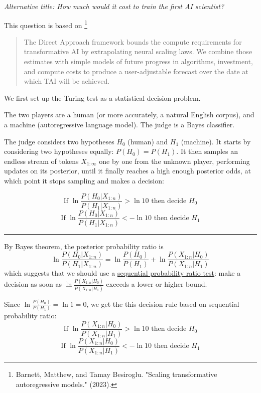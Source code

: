 
\textit{Alternative title: How much would it cost to train the first AI scientist?}

This question is based on \footnote{Barnett, Matthew, and Tamay Besiroglu. "Scaling transformative autoregressive models." (2023).}

\begin{quote}
    The Direct Approach framework bounds the compute requirements for transformative AI by extrapolating neural scaling laws. We combine those estimates with simple models of future progress in algorithms, investment, and compute costs to produce a user-adjustable forecast over the date at which TAI will be achieved.
\end{quote}

We first set up the Turing test as a statistical decision problem.

The two players are a human (or more accurately, a natural English corpus), and a machine (autoregressive language model). The judge is a Bayes classifier. 

The judge considers two hypotheses $H_0$ (human) and $H_1$ (machine). It starts by considering two hypotheses equally: $P(H_0) = P(H_1)$. It then samples an endless stream of tokens $X_{1:\infty}$ one by one from the unknown player, performing updates on its posterior, until it finally reaches a high enough posterior odds, at which point it stops sampling and makes a decision:

$$
\text{If  }\ln \frac{P(H_0|X_{1:n})}{P(H_1|X_{1:n})} > \ln 10 \text{ then decide }H_0
$$
$$
\text{If  }\ln \frac{P(H_0|X_{1:n})}{P(H_1|X_{1:n})} < - \ln 10 \text{ then decide }H_1
$$

\begin{center}\rule{0.5\linewidth}{0.5pt}\end{center}

By Bayes theorem, the posterior probability ratio is
$$\ln \frac{P(H_0|X_{1:n})}{P(H_1|X_{1:n})} = \ln \frac{P(H_0)}{P(H_1)}  + \ln\frac{P(X_{1:n}|H_0)}{P(X_{1:n}|H_1)}$$
which suggests that we should use a \href{https://en.wikipedia.org/wiki/Sequential_probability_ratio_test}{sequential probability ratio test}: make a decision as soon as $\ln\frac{P(X_{1:n}|H_0)}{P(X_{1:n}|H_1)}$ exceeds a lower or higher bound.

Since $\ln \frac{P(H_0)}{P(H_1)} = \ln 1 = 0$, we get the this decision rule based on sequential probability ratio:
$$
\text{If  }\ln \frac{P(X_{1:n}|H_0)}{P(X_{1:n}|H_1)} > \ln 10 \text{ then decide }H_0
$$
$$
\text{If  }\ln \frac{P(X_{1:n}|H_0)}{P(X_{1:n}|H_1)} < - \ln 10 \text{ then decide }H_1
$$

